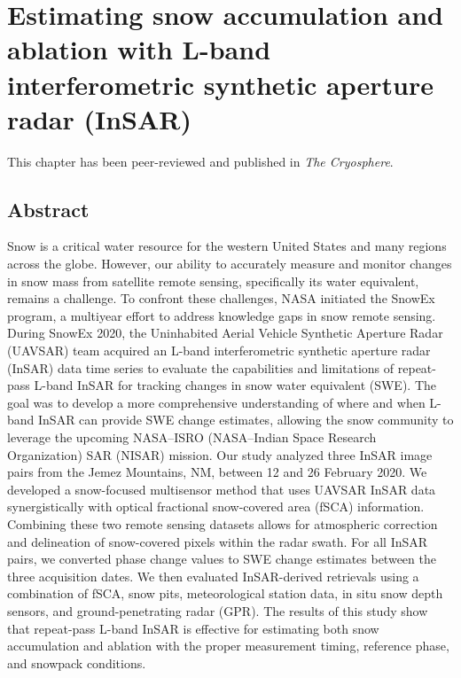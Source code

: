 \hypertarget{ch3}{%
\chapter{Estimating snow accumulation and ablation with L-band interferometric synthetic aperture radar (InSAR)}\label{ch3}}

This chapter has been peer-reviewed and published in \emph{The Cryosphere}.



\hypertarget{ch3-abstract}{\section{Abstract}\label{ch3-abstract}}
Snow is a critical water resource for the western United States and many regions across the globe. However, our ability to accurately measure and monitor changes in snow mass from satellite remote sensing, specifically its water equivalent, remains a challenge. To confront these challenges, NASA initiated the SnowEx program, a multiyear effort to address knowledge gaps in snow remote sensing. During SnowEx 2020, the Uninhabited Aerial Vehicle Synthetic Aperture Radar (UAVSAR) team acquired an L-band interferometric synthetic aperture radar (InSAR) data time series to evaluate the capabilities and limitations of repeat-pass L-band InSAR for tracking changes in snow water equivalent (SWE). The goal was to develop a more comprehensive understanding of where and when L-band InSAR can provide SWE change estimates, allowing the snow community to leverage the upcoming NASA--ISRO (NASA--Indian Space Research Organization) SAR (NISAR) mission. Our study analyzed three InSAR image pairs from the Jemez Mountains, NM, between 12 and 26 February 2020. We developed a snow-focused multisensor method that uses UAVSAR InSAR data synergistically with optical fractional snow-covered area (fSCA) information. Combining these two remote sensing datasets allows for atmospheric correction and delineation of snow-covered pixels within the radar swath. For all InSAR pairs, we converted phase change values to SWE change estimates between the three acquisition dates. We then evaluated InSAR-derived retrievals using a combination of fSCA, snow pits, meteorological station data, in situ snow depth sensors, and ground-penetrating radar (GPR). The results of this study show that repeat-pass L-band InSAR is effective for estimating both snow accumulation and ablation with the proper measurement timing, reference phase, and snowpack conditions.

